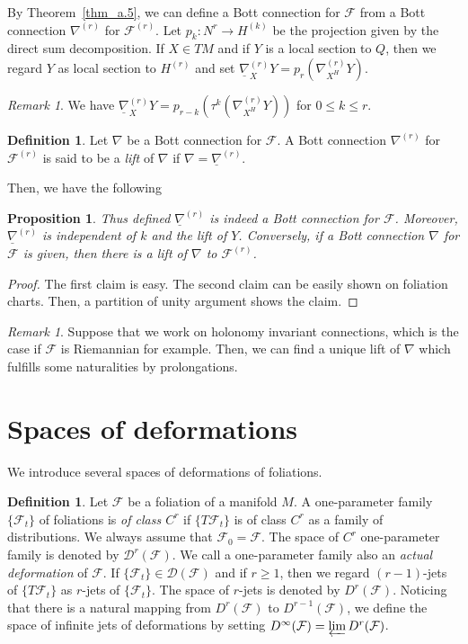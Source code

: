 \documentclass[12pt]{amsart}
\newcommand{\CF}{{\mathcal F}}
\newtheorem{proposition}[theorem]{Proposition}
\theoremstyle{definition}
\newtheorem{definition}[theorem]{Definition}
\theoremstyle{remark}
\newtheorem{remark}[theorem]{Remark}
\begin{document}
By Theorem~\ref{thm_a.5}, we can define a Bott connection for $\CF$ from a Bott connection $\nabla^{(r)}$ for $\CF^{(r)}$.
Let $p_k\colon N^r\to H^{(k)}$ be the projection given by the direct sum decomposition.
If $X\in TM$ and if $Y$ is a local section to $Q$, then we regard $Y$ as local section to $H^{(r)}$ and set $\underline{\nabla}^{(r)}_XY=p_r(\nabla^{(r)}_{X^H}Y)$.

\begin{remark}
We have $\underline{\nabla}^{(r)}_XY=p_{r-k}(\tau^k(\nabla^{(r)}_{X^H}Y))$ for $0\leq k\leq r$.
\end{remark}

\begin{definition}
Let $\nabla$ be a Bott connection for $\CF$.
A Bott connection $\nabla^{(r)}$ for $\CF^{(r)}$ is said to be a \textit{lift} of $\nabla$ if $\nabla=\underline{\nabla}^{(r)}$.
\end{definition}

Then, we have the following

\begin{proposition}
\label{prop_A.9}
Thus defined $\underline{\nabla}^{(r)}$ is indeed a Bott connection for $\CF$.
Moreover, $\underline{\nabla}^{(r)}$ is independent of $k$ and the lift of $Y$.
Conversely, if a Bott connection $\nabla$ for $\CF$ is given, then there is a lift of $\nabla$ to $\CF^{(r)}$.
\end{proposition}
\begin{proof}
The first claim is easy.
The second claim can be easily shown on foliation charts.
Then, a partition of unity argument shows the claim.
\end{proof}

\begin{remark}
Suppose that we work on holonomy invariant connections, which is the case if $\CF$ is Riemannian for example.
Then, we can find a unique lift of $\nabla$ which fulfills some naturalities by prolongations.
\end{remark}

\section{Spaces of deformations}
We introduce several spaces of deformations of foliations.

\begin{definition}
Let $\mathcal{F}$ be a foliation of a manifold $M$.
A one-parameter family $\{\mathcal{F}_t\}$ of foliations is \textit{of class $C^r$} if $\{T\mathcal{F}_t\}$ is of class $C^r$ as a family of distributions.
We always assume that $\mathcal{F}_0=\mathcal{F}$.
The space of $C^r$ one-parameter family is denoted by $\mathscr{D}^r(\mathcal{F})$.
We call a one-parameter family also an \textit{actual deformation} of $\CF$.
If $\{\mathcal{F}_t\}\in\mathscr{D}(\mathcal{F})$ and if $r\geq1$, then we regard $(r-1)$-jets of $\{T\mathcal{F}_t\}$ as $r$-jets of $\{\mathcal{F}_t\}$.
The space of $r$-jets is denoted by $D^r(\mathcal{F})$.
Noticing that there is a natural mapping from $D^r(\mathcal{F})$ to $D^{r-1}(\mathcal{F})$, we define the space of infinite jets of deformations by setting $D^\infty(\mathcal{F})=\varprojlim D^r(\mathcal{F})$.
\end{definition}
\end{document}

